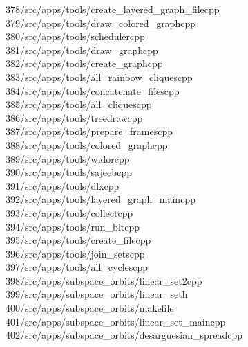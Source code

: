 \begin{tabbing}
378\>/src/apps/tools/create\_layered\_graph\_filecpp\\[0pt]
379\>/src/apps/tools/draw\_colored\_graphcpp\\[0pt]
380\>/src/apps/tools/schedulercpp\\[0pt]
381\>/src/apps/tools/draw\_graphcpp\\[0pt]
382\>/src/apps/tools/create\_graphcpp\\[0pt]
383\>/src/apps/tools/all\_rainbow\_cliquescpp\\[0pt]
384\>/src/apps/tools/concatenate\_filescpp\\[0pt]
385\>/src/apps/tools/all\_cliquescpp\\[0pt]
386\>/src/apps/tools/treedrawcpp\\[0pt]
387\>/src/apps/tools/prepare\_framescpp\\[0pt]
388\>/src/apps/tools/colored\_graphcpp\\[0pt]
389\>/src/apps/tools/widorcpp\\[0pt]
390\>/src/apps/tools/sajeebcpp\\[0pt]
391\>/src/apps/tools/dlxcpp\\[0pt]
392\>/src/apps/tools/layered\_graph\_maincpp\\[0pt]
393\>/src/apps/tools/collectcpp\\[0pt]
394\>/src/apps/tools/run\_bltcpp\\[0pt]
395\>/src/apps/tools/create\_filecpp\\[0pt]
396\>/src/apps/tools/join\_setscpp\\[0pt]
397\>/src/apps/tools/all\_cyclescpp\\[0pt]
398\>/src/apps/subspace\_orbits/linear\_set2cpp\\[0pt]
399\>/src/apps/subspace\_orbits/linear\_seth\\[0pt]
400\>/src/apps/subspace\_orbits/makefile\\[0pt]
401\>/src/apps/subspace\_orbits/linear\_set\_maincpp\\[0pt]
402\>/src/apps/subspace\_orbits/desarguesian\_spreadcpp\\[0pt]

\end{tabbing}
